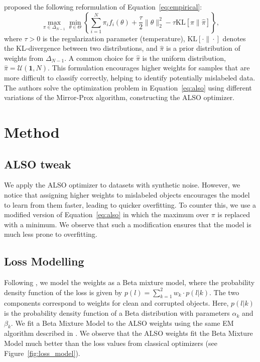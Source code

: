 \documentclass[12pt]{article}
\begin{document}
\citet{also} proposed the following reformulation of Equation~\ref{eq:empirical}:
\begin{equation}
    \max_{\pi \in \Delta_{N-1}} \min_{\theta \in \Theta}
    \left\{
        \sum_{i=1}^{N}\pi_i f_i(\theta)
        + \frac{\tau}{2}\|\theta\|_2^2
        - \tau\text{KL}[\pi\|\hat{\pi}]
    \right\},
    \label{eq:also}
\end{equation}
where \(\tau > 0\) is the regularization parameter (temperature), \(\text{KL}[\cdot\|\cdot]\) denotes the KL-divergence between two distributions, and \(\hat{\pi}\) is a prior distribution of weights from \(\Delta_{N-1}\). A common choice for \(\hat{\pi}\) is the uniform distribution, \(\hat{\pi} = \mathcal{U}(\mathbf{1}, N)\). This formulation encourages higher weights for samples that are more difficult to classify correctly, helping to identify potentially mislabeled data. The authors solve the optimization problem in Equation~\ref{eq:also} using different variations of the Mirror-Prox algorithm, constructing the ALSO optimizer.


\section{Method}

\subsection{ALSO tweak}

We apply the ALSO optimizer to datasets with synthetic noise. However, we notice that assigning higher weights to mislabeled objects encourages the model to learn from them faster, leading to quicker overfitting. To counter this, we use a modified version of Equation~\ref{eq:also} in which the maximum over $\pi$ is replaced with a minimum. We observe that such a modification ensures that the model is much less prone to overfitting.

\subsection{Loss Modelling}

Following \citet{UnsupervisedLabelNoise}, we model the weights as a Beta mixture model, where the probability density function of the loss is given by $p(l) = \sum_{k=1}^2 w_k \cdot p(l|k)$. The two components correspond to weights for clean and corrupted objects. Here, $p(l|k)$ is the probability density function of a Beta distribution with parameters $\alpha_k$ and $\beta_k$. We fit a Beta Mixture Model to the ALSO weights using the same EM algorithm described in \citet{UnsupervisedLabelNoise}. We observe that the ALSO weights fit the Beta Mixture Model much better than the loss values from classical optimizers (see Figure~\ref{fig:loss_model}).
\end{document}
